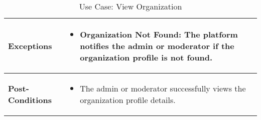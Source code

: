 \begin{table}[!ht]
\begin{tabularx}{\textwidth}{|l|X|}
        \hline
        \textbf{Exceptions} & 
        \begin{itemize}[label=--,itemsep=0pt]
            \item Organization Not Found: The platform notifies the admin or moderator if the organization profile is not found.
        \end{itemize} \\
        \hline
        \textbf{Post-Conditions} & 
        \begin{itemize}[label=--,itemsep=0pt]
            \item The admin or moderator successfully views the organization profile details.
        \end{itemize} \\
        \hline
    \end{tabularx}
    \caption{Use Case: View Organization}
    \label{tab:use-case-view-organization}
\end{table}


